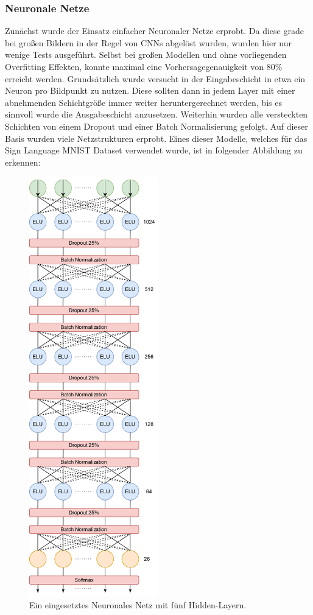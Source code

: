 \documentclass[11pt,bibliography=totocnumbered]{scrartcl}
\begin{document}
\subsubsection{Neuronale Netze}
\label{nntraining}
Zunächst wurde der Einsatz einfacher Neuronaler Netze erprobt. Da diese grade bei großen Bildern in der Regel von CNNs abgelöst wurden, wurden hier nur wenige Tests ausgeführt. Selbst bei großen Modellen und ohne vorliegenden Overfitting Effekten, konnte maximal eine Vorhersagegenauigkeit von 80\% erreicht werden. Grundsätzlich wurde versucht in der Eingabeschicht in etwa ein Neuron pro Bildpunkt zu nutzen. Diese sollten dann in jedem Layer mit einer abnehmenden Schichtgröße immer weiter heruntergerechnet werden, bis es sinnvoll wurde die Ausgabeschicht anzusetzen. Weiterhin wurden alle versteckten Schichten von einem Dropout und einer Batch Normalisierung gefolgt. Auf dieser Basis wurden viele Netzstrukturen erprobt. Eines dieser Modelle, welches für das Sign Language MNIST Dataset verwendet wurde, ist in folgender Abbildung zu erkennen: 
\begin{figure}[H]
	\centering
	\includegraphics[width=0.50\textwidth]{nn_1}
	\vspace*{-3mm}
	\caption[Eingesetztes Neuronales Netz mit fünf Hidden-Layern]{Ein eingesetztes Neuronales Netz mit fünf Hidden-Layern.}
	\label{fig:nn_1}
\end{figure}
\end{document}

